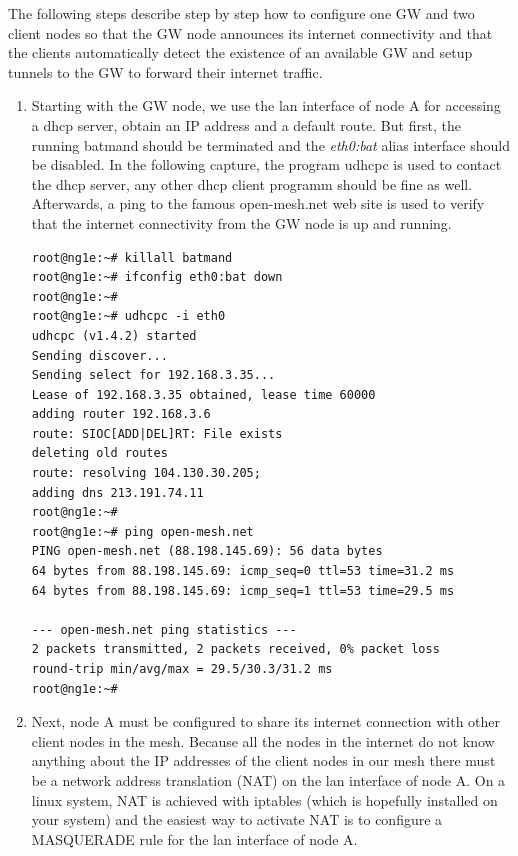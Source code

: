 \documentclass[11pt]{article}
\begin{document}
The following steps describe step by step how to configure one GW and two client nodes so that the GW node announces its internet connectivity and that the clients automatically detect the existence of an available GW and setup tunnels to the GW to forward their internet traffic.

\begin{enumerate}

\item Starting with the GW node, we use the lan interface of node A for accessing a dhcp server, obtain an IP address and a default route.
But first, the running batmand should be terminated and the \emph{eth0:bat} alias interface should be disabled.
In the following capture, the program udhcpc is used to contact the dhcp server, any other dhcp client programm should be fine as well.
Afterwards, a ping to the famous open-mesh.net web site is used to verify that the internet connectivity from the GW node is up and running.

\begin{small} \begin{verbatim}
root@ng1e:~# killall batmand
root@ng1e:~# ifconfig eth0:bat down
root@ng1e:~#
root@ng1e:~# udhcpc -i eth0
udhcpc (v1.4.2) started
Sending discover...
Sending select for 192.168.3.35...
Lease of 192.168.3.35 obtained, lease time 60000
adding router 192.168.3.6
route: SIOC[ADD|DEL]RT: File exists
deleting old routes
route: resolving 104.130.30.205;
adding dns 213.191.74.11
root@ng1e:~# 
root@ng1e:~# ping open-mesh.net
PING open-mesh.net (88.198.145.69): 56 data bytes
64 bytes from 88.198.145.69: icmp_seq=0 ttl=53 time=31.2 ms
64 bytes from 88.198.145.69: icmp_seq=1 ttl=53 time=29.5 ms

--- open-mesh.net ping statistics ---
2 packets transmitted, 2 packets received, 0% packet loss
round-trip min/avg/max = 29.5/30.3/31.2 ms
root@ng1e:~#
\end{verbatim} \end{small}

\item Next, node A must be configured to share its internet connection with other client nodes in the mesh. 
Because all the nodes in the internet do not know anything about the IP addresses of the client nodes in our mesh there must be a network address translation (NAT) on the lan interface of node A. 
On a linux system, NAT is achieved with iptables (which is hopefully installed on your system) and the easiest way to activate NAT is to configure a MASQUERADE rule for the lan interface of node A.


\end{enumerate}
\end{document}
